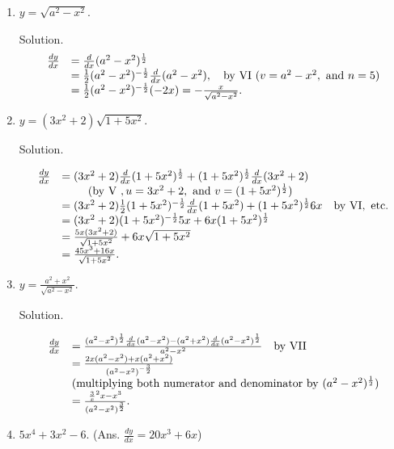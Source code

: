 \begin{enumerate}
\item
$y = \sqrt{a^2 - x^2}$.

Solution. 
\[
\begin{array}{ll}
\frac{dy}{dx} &=	\frac{d}{dx}(a^2 - x^2)^{\frac{1}{2}}\\
& = \frac{1}{2}(a^2 - x^2)^{-\frac{1}{2}}\frac{d}{dx} (a^2 - x^2),  
\ \ \ {\rm	by\ VI}\ (v = a^2 - x^2,\ {\rm and\ }n = 5)\\
& = \frac{1}{2} (a^2 - x^2)^{-\frac{1}{2}} (-2x) = -\frac{x}{\sqrt{a^2 - x^2}}. 
\end{array}
\]

\item
$y = (3x^2 + 2)\sqrt{1 + 5x^2}$.

Solution. 

\[
\begin{array}{ll}
\frac{dy}{dx} &	= (3x^2 + 2) \frac{d}{dx} (1 + 5x^2)^{\frac{1}{2}} 
+ (1 + 5x^2)^{\frac{1}{2}} \frac{d}{dx} (3x^2 + 2)\\
 & \ \ \ \  \ \ \ ({\rm	by\ V\ },
u = 3x^2 + 2,\ {\rm and\ } v = (1 + 5x^2)^{\frac{1}{2}})\\
& = (3x^2 + 2) \frac{1}{2} (1 + 5x^2)^{-\frac{1}{2}} \frac{d}{dx} (1 + 5x^2) 
+ (1 + 5x^2)^{\frac{1}{2}} 6x \ \ \ {\rm	by\ VI,\ etc.}\\
 & = (3x^2 + 2)(1 + 5x^2)^{-\frac{1}{2}} 5x + 6x(1 + 5x^2)^{\frac{1}{2}}\\
 & = \frac{5x(3x^2 + 2)}{\sqrt{1 + 5x^2}} + 6x\sqrt{1 + 5x^2} \\
& = \frac{45x^3 + 16x}{\sqrt{1 + 5x^2}}. 
\end{array}
\]

\item
$y = \frac{a^2 + x^2}{\sqrt{a^2 - x^2}}$.

Solution. 

\[
\begin{array}{ll}
\frac{dy}{dx} & 	= \frac{(a^2 - x^2)^{\frac{1}{2}} \frac{d}{dx} (a^2 - x^2) - (a^2 + x^2) \frac{d}{dx} (a^2 - x^2)^{\frac{1}{2}}}{a^2 - x^2}  \ \ \ {\rm	by\ VII}\\
  &	= \frac{2x(a^2 - x^2) + x(a^2 + x^2)}{(a^2 - x^2)^{-\frac{3}{2}}}\\
 & ({\rm multiplying\ both\ numerator\ and\ denominator\ by\ }(a^2 - x^2)^{\frac{1}{2}})\\
 & = \frac{\frac3 x^2x - x^3}{(a^2 - x^2)^{\frac{3}{2}}}. 
\end{array}
\]

\item
$5x^4 + 3x^2 - 6$. \qquad (Ans.	$\frac{dy}{dx} = 20x^3 + 6x$)


\end{enumerate}
